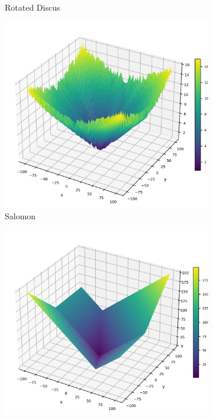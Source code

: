 \begin{figure}[p]
\begin{subfigure}{0.32\textwidth}
        \caption{Rotated Discus}
    \end{subfigure}
    \begin{subfigure}{0.32\textwidth}
        \centering
        \includegraphics[width=1\textwidth]{Figures/benchmark_plots/Salomon_maximized.png}
        \caption{Salomon}
    \end{subfigure}
    \begin{subfigure}{0.32\textwidth}
        \centering
        \includegraphics[width=1\textwidth]{Figures/benchmark_plots/Schwefel_N20_maximized.png}

\end{subfigure}
\end{figure}
